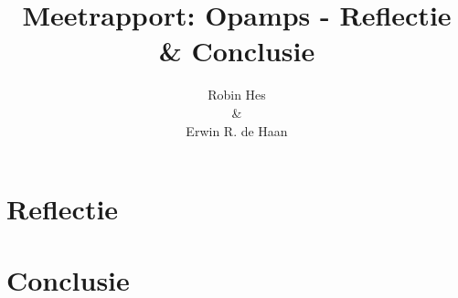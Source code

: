 \documentclass{report}
\title{Meetrapport: Opamps - Reflectie \& Conclusie}
\author{Robin Hes\\\&\\Erwin R. de Haan}
\begin{document}
\chapter{Reflectie}
\chapter{Conclusie}
\end{document}
